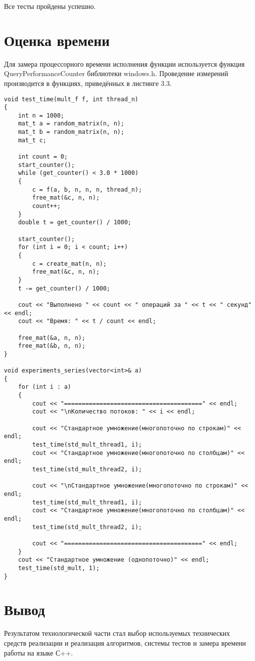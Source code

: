 Все тесты пройдены успешно.

\section{Оценка времени}
Для замера процессорного времени исполнения функции используется функция QueryPerformanceCounter библиотеки windows.h\cite{QueryPerformanceCounter}. Проведение измерений производится в функциях, приведённых в листинге 3.3.

\begin{lstlisting}[caption = {Функции замера процессорного времени работы функции}, captionpos=b]
void test_time(mult_f f, int thread_n)
{
	int n = 1000;
	mat_t a = random_matrix(n, n);
	mat_t b = random_matrix(n, n);
	mat_t c;
	
	int count = 0;
	start_counter();
	while (get_counter() < 3.0 * 1000) 
	{
		c = f(a, b, n, n, n, thread_n);
		free_mat(&c, n, n);
		count++;
	}
	double t = get_counter() / 1000;
	
	start_counter();
	for (int i = 0; i < count; i++)
	{
		c = create_mat(n, n);
		free_mat(&c, n, n);
	}
	t -= get_counter() / 1000;
	
	cout << "Выполнено " << count << " операций за " << t << " секунд" << endl;
	cout << "Время: " << t / count << endl;
	
	free_mat(&a, n, n);
	free_mat(&b, n, n);
}

void experiments_series(vector<int>& a)
{
	for (int i : a)
	{
		cout << "=======================================" << endl;
		cout << "\nКоличество потоков: " << i << endl;
		
		cout << "Стандартное умножение(многопоточно по строкам)" << endl;
		test_time(std_mult_thread1, i);
		cout << "Стандартное умножение(многопоточно по столбцам)" << endl;
		test_time(std_mult_thread2, i);
		
		cout << "\nСтандартное умножение(многопоточно по строкам)" << endl;
		test_time(std_mult_thread1, i);
		cout << "Стандартное умножение(многопоточно по столбцам)" << endl;
		test_time(std_mult_thread2, i);
		
		cout << "=======================================" << endl;
	}
	cout << "Стандартное умножение (однопоточно)" << endl;
	test_time(std_mult, 1);
}

\end{lstlisting}

\section*{Вывод}
Результатом технологической части стал выбор используемых технических средств реализации и реализация алгоритмов, системы тестов и замера времени работы на языке С++.
